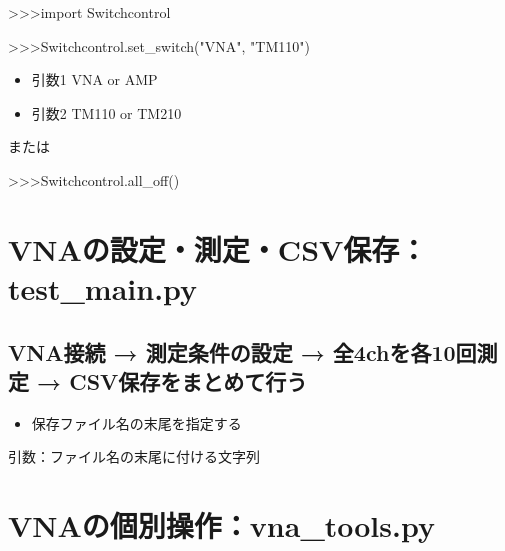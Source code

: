 \documentclass[a4paper,11pt]{ltjsarticle}
\begin{document}
\begin{command}

>>>import Switchcontrol

>>>Switchcontrol.set_switch("VNA", "TM110")

\end{command}

\begin{itemize}

\item 引数1 VNA or AMP

\item 引数2 TM110 or TM210

\end{itemize}

または


\begin{command}

>>>Switchcontrol.all_off()

\end{command}

\section{VNAの設定・測定・CSV保存：test\_main.py}

\subsection{VNA接続 → 測定条件の設定 → 全4chを各10回測定 → CSV保存をまとめて行う}

\begin{command}


\end{command}

\begin{itemize}

\item 保存ファイル名の末尾を指定する

\begin{command}


\end{command}

\end{itemize}

引数：ファイル名の末尾に付ける文字列


\section{VNAの個別操作：vna\_tools.py}
\end{document}
